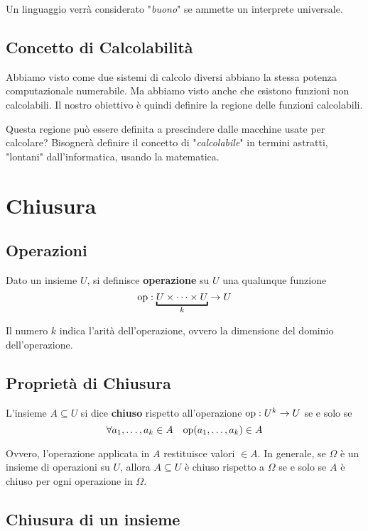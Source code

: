Un linguaggio verrà considerato "\textit{buono}" se ammette un interprete universale.

\subsection{Concetto di Calcolabilità}

Abbiamo visto come due sistemi di calcolo diversi abbiano la stessa potenza computazionale numerabile. Ma abbiamo visto anche che esistono funzioni non calcolabili. Il nostro obiettivo è quindi definire la regione delle funzioni calcolabili.

Questa regione può essere definita a prescindere dalle macchine usate per calcolare? Bisognerà definire il concetto di "\textit{calcolabile}" in termini astratti, "lontani" dall'informatica, usando la matematica.

\section{Chiusura}

\subsection{Operazioni}

Dato un insieme $U$, si definisce \textbf{operazione} su $U$ una qualunque funzione
$$ \op: \underbracket{U \times \cdots \times U}_k \rightarrow U $$

Il numero $k$ indica l'arità dell'operazione, ovvero la dimensione del dominio dell'operazione.

\subsection{Proprietà di Chiusura}

L'insieme $A \subseteq U$ si dice \textbf{chiuso} rispetto all'operazione $\operatorname{op} : U^k \rightarrow U$ se e solo se
$$ \forall a_1, \dots, a_k \in A \;\;\; \operatorname{op}(a_1, \dots, a_k) \in A $$

Ovvero, l'operazione applicata in $A$ restituisce valori $\in A$. In generale, se $\Omega$ è un insieme di operazioni su $U$, allora $A \subseteq U$ è chiuso rispetto a $\Omega$ se e solo se $A$ è chiuso per ogni operazione in $\Omega$.

\subsection{Chiusura di un insieme}

